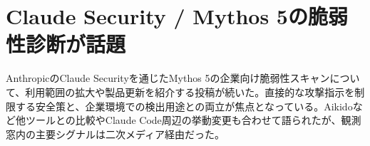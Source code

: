 \section{Claude Security / Mythos 5の脆弱性診断が話題}
AnthropicのClaude Securityを通じたMythos 5の企業向け脆弱性スキャンについて、利用範囲の拡大や製品更新を紹介する投稿が続いた。直接的な攻撃指示を制限する安全策と、企業環境での検出用途との両立が焦点となっている。Aikidoなど他ツールとの比較やClaude Code周辺の挙動変更も合わせて語られたが、観測窓内の主要シグナルは二次メディア経由だった。
